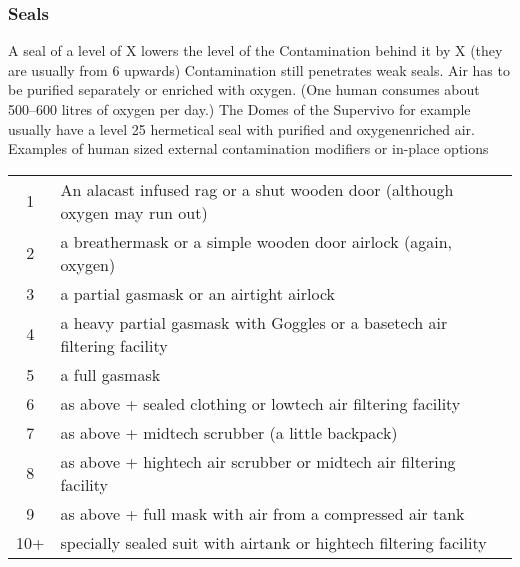     \subsubsection{Seals}
    A seal of a level of X lowers the level of the Contamination behind it by X (they are usually from 6 upwards)
    Contamination still penetrates weak seals.
    Air has to be purified separately or enriched with oxygen.
    (One human consumes about 500--600 litres of oxygen per day.) The Domes of the Supervivo for
    example usually have a level 25 hermetical seal with purified and oxygenenriched air.\vspace{1.5cm}
    Examples of human sized external contamination modifiers or in-place options\vspace{1.5cm}
    \begin{tabular}{cl}
        1& An alacast infused rag or a shut wooden door (although oxygen may run out)\\
        2& a breathermask or a simple wooden door airlock (again, oxygen)\\
        3& a partial gasmask  or an airtight airlock\\
        4& a heavy partial gasmask with Goggles or a basetech air filtering facility\\
        5& a full gasmask\\
        6& as above + sealed clothing or lowtech air filtering facility\\
        7& as above + midtech scrubber (a little backpack)\\
        8& as above + hightech air scrubber or midtech air filtering facility\\
        9& as above + full mask with air from a compressed air tank\\
       10+& specially sealed suit with airtank or hightech filtering facility\\
    \end{tabular}\pagebreak
